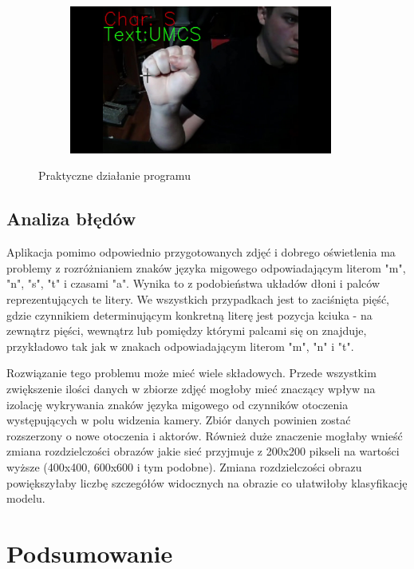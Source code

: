 \documentclass[a4paper,12pt,oneside]{book} %
\begin{document}
\begin{figure}[h]
\begin{subfigure}{0.4\textwidth}
	\end{subfigure}
	\begin{subfigure}{0.4\textwidth}
		\centering
		\includegraphics[width=0.95\textwidth]{UMCS.jpg}
	\end{subfigure}
	\caption{Praktyczne działanie programu}
	\label{umcs}
\end{figure}

\section{Analiza błędów}

Aplikacja pomimo odpowiednio przygotowanych zdjęć i dobrego oświetlenia ma problemy z rozróżnianiem znaków języka migowego odpowiadającym literom "m", "n", "s", "t" i czasami "a". Wynika to z podobieństwa układów dłoni i palców reprezentujących te litery. We wszystkich przypadkach jest to zaciśnięta pięść, gdzie czynnikiem determinującym konkretną literę jest pozycja kciuka - na zewnątrz pięści, wewnątrz lub pomiędzy którymi palcami się on znajduje, przykładowo tak jak w znakach odpowiadającym literom "m", "n" i "t".

Rozwiązanie tego problemu może mieć wiele składowych. Przede wszystkim zwiększenie ilości danych w zbiorze zdjęć mogłoby mieć znaczący wpływ na izolację wykrywania znaków języka migowego od czynników otoczenia występujących w polu widzenia kamery. Zbiór danych powinien zostać rozszerzony o nowe otoczenia i aktorów. Również duże znaczenie mogłaby wnieść zmiana rozdzielczości obrazów jakie sieć przyjmuje z 200x200 pikseli na wartości wyższe (400x400, 600x600 i tym podobne). Zmiana rozdzielczości obrazu powiększyłaby liczbę szczegółów widocznych na obrazie co ułatwiłoby klasyfikację modelu.

\chapter{Podsumowanie}
\end{document}
